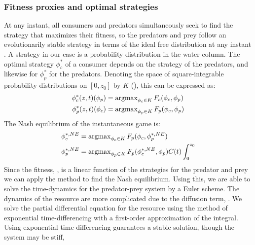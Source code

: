 \subsubsection*{Fitness proxies and optimal strategies}




At any instant, all consumers and predators simultaneously seek to find the strategy that maximizes their fitness, so the predators and prey follow an evolutionarily stable strategy in terms of the ideal free distribution at any instant \citep{cressman2010ideal}. A strategy in our case is a probability distribution in the water column. The optimal strategy $\phi_c^*$ of a consumer depends on the strategy of the predators, and likewise for $\phi_p^*$ for the predators. Denoting the space of square-integrable probability distributions on $[0,z_0]$ by $K$ (), this can be expressed as:
\begin{align*}
	\phi_c^*(z,t)(\phi_p) &= \argmax_{\phi_c \in K}  F_c(\phi_c, \phi_p)  \\
	\phi_p^*(z,t)(\phi_c) &= \argmax_{\phi_p \in K} F_p(\phi_c, \phi_p)
\end{align*}
The Nash equilibrium of the instantaneous game is:
\begin{align}
  \label{eq:nash_equilibria}
	\phi_c^{*,NE} &=  \argmax_{\phi_c \in K}  F_p(\phi_c, \phi_p^{*,NE}) \\
	\phi_p^{*,NE} &=  \argmax_{\phi_p \in K} F_p(\phi_c^{*,NE}, \phi_p) C(t) \int_0^{z_0}
\end{align}
Since the fitness, , is a linear function of the strategies for the predator and prey we can apply the method  to find the Nash equilibrium. Using this, we are able to solve the time-dynamics for the predator-prey system by a Euler scheme. The dynamics of the resource are more complicated due to the diffusion term, . We solve the partial differential equation for the resource using the method of exponential time-differencing with a first-order approximation of the integral. Using exponential time-differencing guarantees a stable solution, though the system may be stiff, \cite{hochbruck2010exponential}


